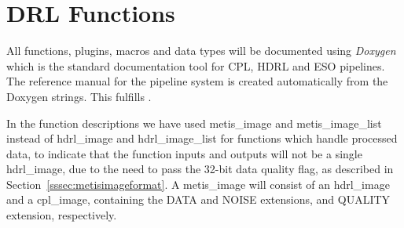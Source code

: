 \clearpage
\section{DRL Functions}\label{sec:drl_functions}


All functions, plugins, macros and data types will be documented using
\emph{Doxygen} which is the standard documentation tool for CPL, HDRL and ESO
pipelines. The reference manual for the pipeline system is created automatically
from the Doxygen strings. This fulfills .

In the function descriptions we have used metis\_image and
metis\_image\_list instead of hdrl\_image and hdrl\_image\_list for functions which handle
processed data, to
indicate that the function inputs and outputs will not be a single
hdrl\_image, due to the need to pass the 32-bit data quality flag, as
described in Section~\ref{sssec:metisimageformat}.  A metis\_image will
consist of an hdrl\_image and a cpl\_image, containing the DATA and
NOISE extensions, and QUALITY extension, respectively.











